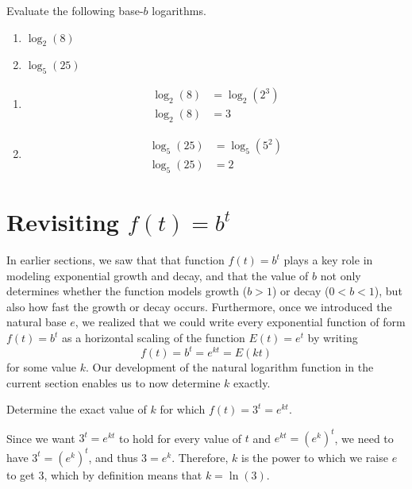 \documentclass[nooutcomes]{ximera}
\begin{document}
\begin{example} Evaluate the following base-$b$ logarithms.
\begin{enumerate}
\item $\log_{2}(8)$
\item $\log_{5}(25)$
\end{enumerate}
\begin{explanation}
\begin{enumerate}
\item 
\begin{align*}
\log_{2}(8)&=\log_{2}(2^3) \\
\log_{2}(8)&= 3
\end{align*}

\item
\begin{align*} 
\log_{5}(25)&=\log_{5}(5^2) \\
\log_{5}(25) & = 2
\end{align*}

\end{enumerate}
\end{explanation}
\end{example}

%
%
%
\section{Revisiting $f(t) = b^t$}

In earlier sections, we saw that that function \(f(t) = b^t\) plays a key role in modeling exponential growth and decay, and that the value of \(b\) not only determines whether the function models growth (\(b > 1\)) or decay (\(0 < b < 1\)), but also how fast the growth or decay occurs.  Furthermore, once we introduced the natural base \(e\), we realized that we could write every exponential function of form \(f(t) = b^t\) as a horizontal scaling of the function \(E(t) = e^t\) by writing%
\begin{equation*}
f(t) = b^t = e^{kt} = E(kt)
\end{equation*}
for some value \(k\).  Our development of the natural logarithm function in the current section enables us to now determine \(k\) exactly.%
\begin{example}

Determine the exact value of \(k\) for which \(f(t) = 3^t = e^{kt}\).%

\begin{explanation} Since we want \(3^t = e^{kt}\) to hold for every value of \(t\) and \(e^{kt} = (e^k)^t\), we need to have \(3^t = (e^k)^t\), and thus \(3 = e^k\).  Therefore, \(k\) is the power to which we raise \(e\) to get \(3\), which by definition means that \(k = \ln(3)\).%
\end{explanation}
\end{example}
\end{document}
